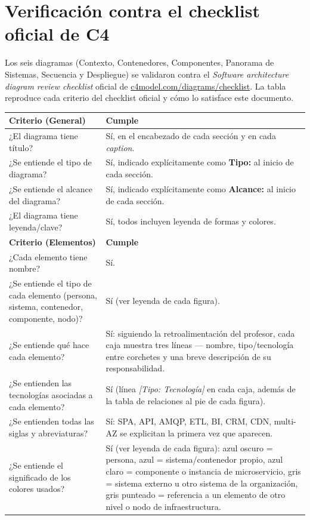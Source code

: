 \documentclass[12pt,a4paper]{article}
\begin{document}
\section{Verificación contra el checklist oficial de C4}

Los seis diagramas (Contexto, Contenedores, Componentes, Panorama de Sistemas, Secuencia y
Despliegue) se validaron contra el \textit{Software architecture diagram review checklist} oficial
de \href{https://c4model.com/diagrams/checklist}{c4model.com/diagrams/checklist}. La tabla
reproduce cada criterio del checklist oficial y cómo lo satisface este documento.

\begin{longtable}{p{9.5cm}p{4.5cm}}
\toprule
\textbf{Criterio (General)} & \textbf{Cumple}\\
\midrule
¿El diagrama tiene título? & Sí, en el encabezado de cada sección y en cada \textit{caption}.\\
¿Se entiende el tipo de diagrama? & Sí, indicado explícitamente como \textbf{Tipo:} al inicio de cada sección.\\
¿Se entiende el alcance del diagrama? & Sí, indicado explícitamente como \textbf{Alcance:} al inicio de cada sección.\\
¿El diagrama tiene leyenda/clave? & Sí, todos incluyen leyenda de formas y colores.\\
\midrule
\textbf{Criterio (Elementos)} & \textbf{Cumple}\\
\midrule
¿Cada elemento tiene nombre? & Sí.\\
¿Se entiende el tipo de cada elemento (persona, sistema, contenedor, componente, nodo)? & Sí (ver leyenda de cada figura).\\
¿Se entiende qué hace cada elemento? & Sí: siguiendo la retroalimentación del profesor, cada caja
muestra tres líneas --- nombre, tipo/tecnología entre corchetes y una breve descripción de su
responsabilidad.\\
¿Se entienden las tecnologías asociadas a cada elemento? & Sí (línea \textit{[Tipo: Tecnología]} en
cada caja, además de la tabla de relaciones al pie de cada figura).\\
¿Se entienden todas las siglas y abreviaturas? & Sí: SPA, API, AMQP, ETL, BI, CRM, CDN, multi-AZ se explicitan la primera vez que aparecen.\\
¿Se entiende el significado de los colores usados? & Sí (ver leyenda de cada figura): azul oscuro = persona, azul = sistema/contenedor propio, azul claro = componente o instancia de microservicio, gris = sistema externo u otro sistema de la organización, gris punteado = referencia a un elemento de otro nivel o nodo de infraestructura.\\

\end{longtable}
\end{document}
